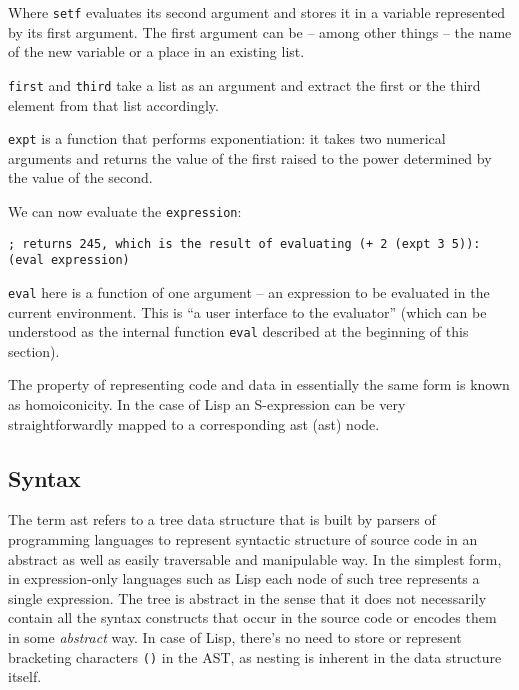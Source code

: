 Where \texttt{setf} evaluates its second argument and stores it in a variable represented by its first argument. The first argument can be -- among other things\cite[Section~11.15.1]{emacs_lisp_reference} -- the name of the new variable or a place in an existing list. 

\texttt{first} and \texttt{third} take a list as an argument and extract the first or the third element from that list accordingly.

\texttt{expt} is a function that performs exponentiation: it takes two numerical arguments and returns the value of the first raised to the power determined by the value of the second.

We can now evaluate the \texttt{expression}:
\begin{lstlisting}
; returns 245, which is the result of evaluating (+ 2 (expt 3 5)):
(eval expression)
\end{lstlisting}

\texttt{eval} here is a function of one argument -- an expression to be evaluated in the current environment. This is ``a user interface to the evaluator''\cite[Section~3.8, Function~EVAL]{common_lisp_hyperspec} (which can be understood as the internal function \texttt{eval} described at the beginning of this section).

The property of representing code and data in essentially the same form is known as homoiconicity\cite{homoiconicity_wikipedia, c2_homoiconicity, homoiconicity}. In the case of Lisp an S-expression can be very straightforwardly mapped to a corresponding \acrlong{ast} (\acrshort{ast}) node.


\subsection{Syntax}
The term \acrshort{ast} refers to a tree data structure that is built
by parsers of programming languages to represent syntactic structure of source
code in an abstract as well as easily traversable and manipulable way. In the simplest form, in expression-only languages such as Lisp each node of such tree
represents a single expression. The tree is abstract in the sense that it does
not necessarily contain all the syntax constructs that occur in the source code
or encodes them in some \textit{abstract} way. In case of Lisp, there's no need to store or represent bracketing characters \texttt{()} in the AST, as nesting is inherent in the data structure itself.

